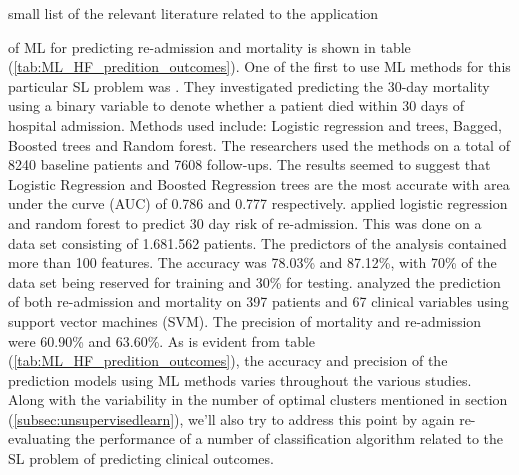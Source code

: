 \documentclass[../thesis.tex]{subfiles}
\begin{document}
small list of the relevant literature related to the application



\noindent of ML for predicting re-admission and mortality is shown in table (\ref{tab:ML_HF_predition_outcomes}). One of the first to use ML methods for this particular SL problem was \cite{austin2012regression}. They investigated predicting the 30-day mortality using a binary variable to denote whether a patient died within 30 days of hospital admission. Methods used include: Logistic regression and trees, Bagged, Boosted trees and Random forest. The researchers used the methods on a total of 8240 baseline patients and 7608 follow-ups. The results seemed to suggest that Logistic Regression and Boosted Regression trees are the most accurate with area under the curve (AUC) of 0.786 and 0.777 respectively. \cite{zolfaghar2013big} applied logistic regression and random forest to predict 30 day risk of re-admission. This was done on a data set consisting of 1.681.562 patients. The predictors of the analysis contained more than 100 features. The accuracy was 78.03\% and 87.12\%, with 70\% of the data set being reserved for training and 30\% for testing. \cite{shah2014phenomapping} analyzed the prediction of both re-admission and mortality on 397 patients and 67 clinical variables using support vector machines (SVM). The precision of mortality and re-admission were 60.90\% and 63.60\%. As is evident from table (\ref{tab:ML_HF_predition_outcomes}), the accuracy and precision of the prediction models using ML methods varies throughout the various studies. Along with the variability in the number of optimal clusters mentioned in section (\ref{subsec:unsupervisedlearn}), we'll also try to address this point by again re-evaluating the performance of a number of classification algorithm related to the SL problem of predicting clinical outcomes. 
\end{document}
